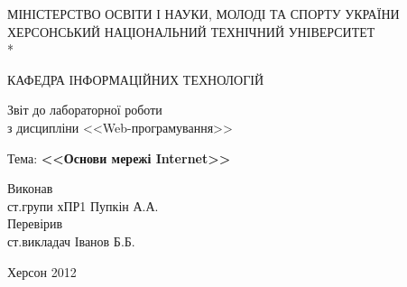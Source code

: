 
\hrulefill

\begin{center}
МІНІСТЕРСТВО ОСВІТИ І НАУКИ, МОЛОДІ ТА СПОРТУ УКРАЇНИ \\

ХЕРСОНСЬКИЙ НАЦІОНАЛЬНИЙ ТЕХНІЧНИЙ УНІВЕРСИТЕТ \\*

КАФЕДРА ІНФОРМАЦІЙНИХ ТЕХНОЛОГІЙ

\end{center}

\vspace{5em}

\begin{center}
\Large Звіт до лабораторної роботи  \\ з дисципліни <<Web-програмування>>
\end{center}

\vspace{2.5em}

\begin{center}
{\Large Тема: \textbf{<<Основи мережі Internet>>}}
\end{center}

\vspace{5em}





\begin{flushleft}
Виконав \\ст.групи хПР1 \hspace{\fill} Пупкін А.А. \\
\vspace{1em}
Перевірив \\ст.викладач \hspace{\fill} Іванов Б.Б.\\
\end{flushleft}

\vspace{\fill}

\begin{center}
Херсон 2012
\end{center}
\newpage
